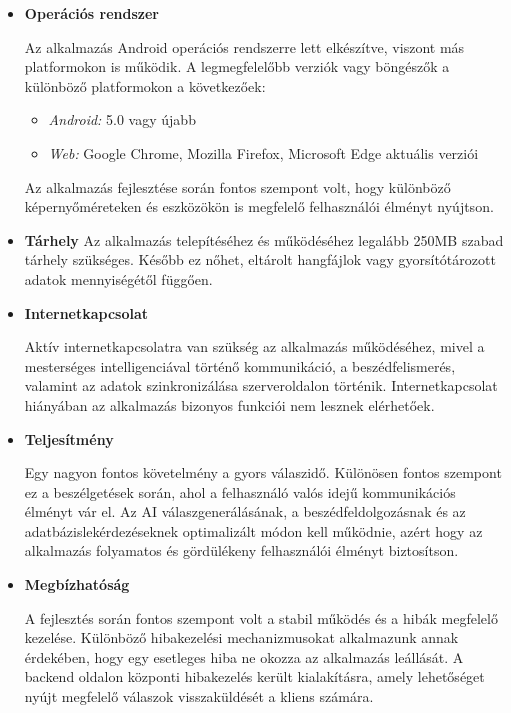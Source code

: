\begin{itemize}
    \item \textbf{Operációs rendszer}
    
    Az alkalmazás Android operációs rendszerre lett elkészítve, viszont más platformokon is működik. A legmegfelelőbb verziók vagy böngészők a különböző platformokon a következőek:
     \begin{itemize}
        \item \textit{Android:} 5.0 vagy újabb
        \item \textit{Web:} Google Chrome, Mozilla Firefox, Microsoft Edge aktuális verziói
     \end{itemize}
    Az alkalmazás fejlesztése során fontos szempont volt, hogy különböző képernyőméreteken és eszközökön is megfelelő felhasználói élményt nyújtson.

    \item \textbf{Tárhely}
    Az alkalmazás telepítéséhez és működéséhez legalább 250MB szabad tárhely szükséges. Később ez nőhet, eltárolt hangfájlok vagy gyorsítótározott adatok mennyiségétől függően.

    \item \textbf{Internetkapcsolat}

    Aktív internetkapcsolatra van szükség az alkalmazás működéséhez, mivel a mesterséges intelligenciával történő kommunikáció, a beszédfelismerés, valamint az adatok szinkronizálása szerveroldalon történik. Internetkapcsolat hiányában az alkalmazás bizonyos funkciói nem lesznek elérhetőek.

    \item \textbf{Teljesítmény}

    Egy nagyon fontos követelmény a gyors válaszidő. Különösen fontos szempont ez a beszélgetések során, ahol a felhasználó valós idejű kommunikációs élményt vár el. Az AI válaszgenerálásának, a beszédfeldolgozásnak és az adatbázislekérdezéseknek optimalizált módon kell működnie, azért hogy az alkalmazás folyamatos és gördülékeny felhasználói élményt biztosítson.

    \item \textbf{Megbízhatóság}

    A fejlesztés során fontos szempont volt a stabil működés és a hibák megfelelő kezelése. Különböző hibakezelési mechanizmusokat alkalmazunk annak érdekében, hogy egy esetleges hiba ne okozza az alkalmazás leállását. A backend oldalon központi hibakezelés került kialakításra, amely lehetőséget nyújt megfelelő válaszok visszaküldését a kliens számára.


\end{itemize}
